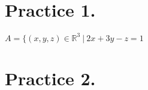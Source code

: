 \documentclass[a4paper,12pt]{article}
\begin{document}
%
%
%
%


\section*{Practice 1.}
$A=\{ (x,y,z)\in \mathbb{R}^3 ~|~2x+3y-z=1$
%
%
%
%
\section*{Practice 2.}
\end{document}
